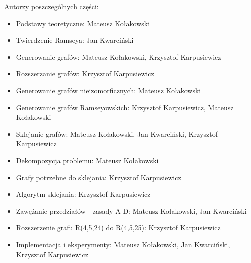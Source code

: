 Autorzy poszczególnych części:
\begin{itemize}
\item Podstawy teoretyczne: Mateusz Kołakowski
\item Twierdzenie Ramseya:  Jan Kwarciński
\item Generowanie grafów: Mateusz Kołakowski, Krzysztof Karpusiewicz
\item Rozszerzanie grafów: Krzysztof Karpusiewicz
\item Generowanie grafów nieizomorficznych: Mateusz Kołakowski
\item Generowanie grafów Ramseyowskich: Krzysztof Karpusiewicz, Mateusz Kołakowski
\item Sklejanie grafów: Mateusz Kołakowski, Jan Kwarciński, Krzysztof Karpusiewicz
\item Dekompozycja problemu: Mateusz Kołakowski
\item Grafy potrzebne do sklejania: Krzysztof Karpusiewicz
\item Algorytm sklejania: Krzysztof Karpusiewicz
\item Zawężanie przedziałów - zasady A-D: Mateusz Kołakowski, Jan Kwarciński
\item Rozszerzenie grafu R(4,5,24) do R(4,5,25): Krzysztof Karpusiewicz
\item Implementacja i eksperymenty: Mateusz Kołakowski, Jan Kwarciński, Krzysztof Karpusiewicz
\end{itemize}


